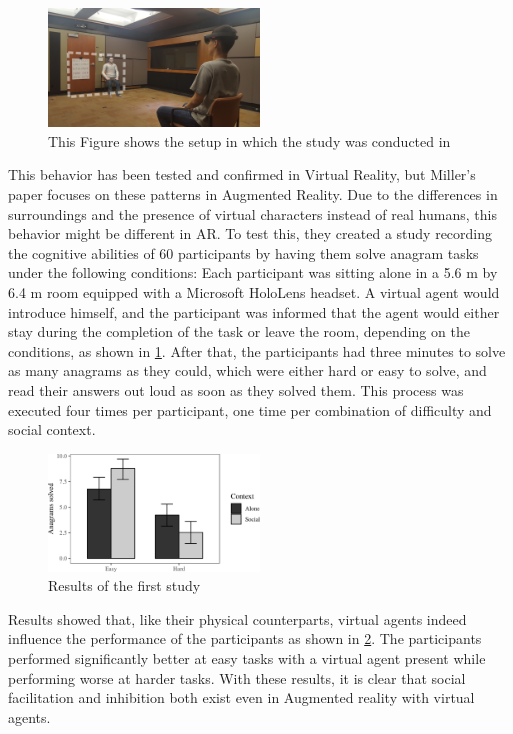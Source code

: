 \begin{figure}[H]
\centering
\includegraphics[width = 0.5\textwidth]{figures/pone.0216290.g001.PNG_L.png}
\caption[Study 1 setup]{This Figure shows the setup in which the study was conducted in}
\label{fig::firstSetup}
\end{figure}


This behavior has been tested and confirmed in Virtual Reality, but Miller’s paper focuses on these patterns in Augmented Reality. Due to the differences in surroundings and the presence of virtual characters instead of real humans, this behavior might be different in AR. To test this, they created a study recording the cognitive abilities of 60 participants by having them solve anagram tasks under the following conditions: Each participant was sitting alone in a 5.6 m by 6.4 m room equipped with a Microsoft HoloLens headset. A virtual agent would introduce himself, and the participant was informed that the agent would either stay during the completion of the task or leave the room, depending on the conditions, as shown in \ref{fig::firstSetup}. After that, the participants had three minutes to solve as many anagrams as they could, which were either hard or easy to solve, and read their answers out loud as soon as they solved them. This process was executed four times per participant, one time per combination of difficulty and social context. 


\begin{figure}[H]
\centering
\includegraphics[width = 0.5\textwidth]{figures/pone.0216290.g003.PNG_L.png}
\caption[Study 1 result]{Results of the first study}
\label{fig::firstResult}
\end{figure}


Results showed that, like their physical counterparts, virtual agents indeed influence the performance of the participants as shown in \ref{fig::firstResult}. The participants performed significantly better at easy tasks with a virtual agent present while performing worse at harder tasks. With these results, it is clear that social facilitation and inhibition both exist even in Augmented reality with virtual agents.


